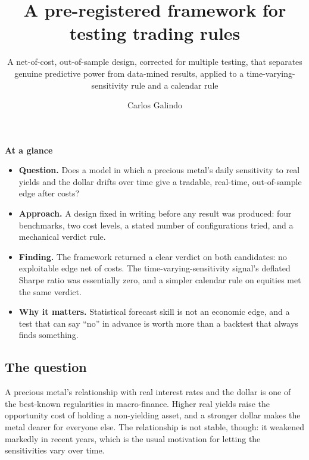 \documentclass[
  british,
  a4paper,
]{article}
\title{A pre-registered framework for testing trading rules}
\subtitle{A net-of-cost, out-of-sample design, corrected for multiple
testing, that separates genuine predictive power from data-mined
results, applied to a time-varying-sensitivity rule and a calendar rule}
\author{Carlos Galindo}
\date{}
\providecommand{\tightlist}{%
  \setlength{\itemsep}{0pt}\setlength{\parskip}{0pt}}
\begin{document}
\maketitle


\begin{tcolorbox}[enhanced jigsaw, arc=.35mm, bottomrule=.15mm, breakable, colback=white, colframe=quarto-callout-note-color-frame, left=2mm, leftrule=.75mm, opacityback=0, rightrule=.15mm, toprule=.15mm]

\vspace{-3mm}\textbf{At a glance}\vspace{3mm}

\begin{itemize}
\tightlist
\item
  \textbf{Question.} Does a model in which a precious metal's daily
  sensitivity to real yields and the dollar drifts over time give a
  tradable, real-time, out-of-sample edge after costs?
\item
  \textbf{Approach.} A design fixed in writing before any result was
  produced: four benchmarks, two cost levels, a stated number of
  configurations tried, and a mechanical verdict rule.
\item
  \textbf{Finding.} The framework returned a clear verdict on both
  candidates: no exploitable edge net of costs. The
  time-varying-sensitivity signal's deflated Sharpe ratio was
  essentially zero, and a simpler calendar rule on equities met the same
  verdict.
\item
  \textbf{Why it matters.} Statistical forecast skill is not an economic
  edge, and a test that can say ``no'' in advance is worth more than a
  backtest that always finds something.
\end{itemize}

\end{tcolorbox}

\subsection{The question}\label{the-question}

A precious metal's relationship with real interest rates and the dollar
is one of the best-known regularities in macro-finance. Higher real
yields raise the opportunity cost of holding a non-yielding asset, and a
stronger dollar makes the metal dearer for everyone else. The
relationship is not stable, though: it weakened markedly in recent
years, which is the usual motivation for letting the sensitivities vary
over time.
\end{document}
